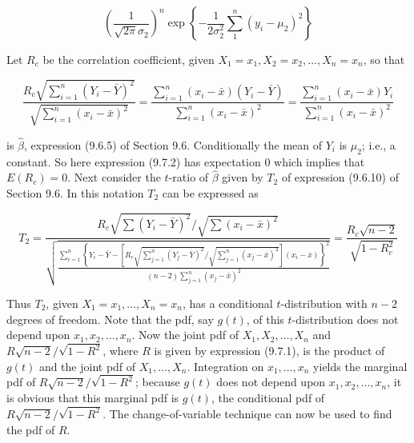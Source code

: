 $$
\left(\frac{1}{\sqrt{2 \pi} \sigma_{2}}\right)^{n} \exp \left\{-\frac{1}{2 \sigma_{2}^{2}} \sum_{1}^{n}\left(y_{i}-\mu_{2}\right)^{2}\right\}
$$

Let $R_{c}$ be the correlation coefficient, given $X_{1}=x_{1}, X_{2}=x_{2}, \ldots, X_{n}=x_{n}$, so that


\begin{equation*}
\frac{R_{c} \sqrt{\sum_{i=1}^{n}\left(Y_{i}-\bar{Y}\right)^{2}}}{\sqrt{\sum_{i=1}^{n}\left(x_{i}-\bar{x}\right)^{2}}}=\frac{\sum_{i=1}^{n}\left(x_{i}-\bar{x}\right)\left(Y_{i}-\bar{Y}\right)}{\sum_{i=1}^{n}\left(x_{i}-\bar{x}\right)^{2}}=\frac{\sum_{i=1}^{n}\left(x_{i}-\bar{x}\right) Y_{i}}{\sum_{i=1}^{n}\left(x_{i}-\bar{x}\right)^{2}} \tag{9.7.2}
\end{equation*}


is $\hat{\beta}$, expression (9.6.5) of Section 9.6. Conditionally the mean of $Y_{i}$ is $\mu_{2}$; i.e., a constant. So here expression (9.7.2) has expectation 0 which implies that $E\left(R_{c}\right)=0$. Next consider the $t$-ratio of $\hat{\beta}$ given by $T_{2}$ of expression (9.6.10) of Section 9.6. In this notation $T_{2}$ can be expressed as


\begin{equation*}
T_{2}=\frac{R_{c} \sqrt{\sum\left(Y_{i}-\bar{Y}\right)^{2}} / \sqrt{\sum\left(x_{i}-\bar{x}\right)^{2}}}{\sqrt{\frac{\sum_{i=1}^{n}\left\{Y_{i}-\bar{Y}-\left[R_{c} \sqrt{\sum_{j=1}^{n}\left(Y_{j}-\bar{Y}\right)^{2}} / \sqrt{\sum_{j=1}^{n}\left(x_{j}-\bar{x}\right)^{2}}\right]\left(x_{i}-\bar{x}\right)\right\}^{2}}{(n-2) \sum_{j=1}^{n}\left(x_{j}-\bar{x}\right)^{2}}}}=\frac{R_{c} \sqrt{n-2}}{\sqrt{1-R_{c}^{2}}} \tag{9.7.3}
\end{equation*}


Thus $T_{2}$, given $X_{1}=x_{1}, \ldots, X_{n}=x_{n}$, has a conditional $t$-distribution with $n-2$ degrees of freedom. Note that the pdf, say $g(t)$, of this $t$-distribution does not depend upon $x_{1}, x_{2}, \ldots, x_{n}$. Now the joint pdf of $X_{1}, X_{2}, \ldots, X_{n}$ and $R \sqrt{n-2} / \sqrt{1-R^{2}}$, where $R$ is given by expression (9.7.1), is the product of $g(t)$ and the joint pdf of $X_{1}, \ldots, X_{n}$. Integration on $x_{1}, \ldots, x_{n}$ yields the marginal pdf of $R \sqrt{n-2} / \sqrt{1-R^{2}}$; because $g(t)$ does not depend upon $x_{1}, x_{2}, \ldots, x_{n}$, it is obvious that this marginal pdf is $g(t)$, the conditional pdf of $R \sqrt{n-2} / \sqrt{1-R^{2}}$. The change-of-variable technique can now be used to find the pdf of $R$.

